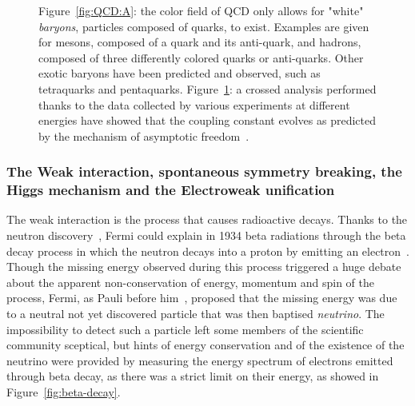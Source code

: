 \begin{figure}[H]
\begin{subfigure}{0.4\linewidth}
			\caption{\label{fig:QCD:B}}
		\end{subfigure}
		\caption{\label{fig:QCD} Figure~\ref{fig:QCD:A}: the color field of QCD only allows for "white" \textit{baryons}, particles composed of quarks, to exist. Examples are given for mesons, composed of a quark and its anti-quark, and hadrons, composed of three differently colored quarks or anti-quarks. Other exotic baryons have been predicted and observed, such as tetraquarks and pentaquarks. Figure~\ref{fig:QCD:B}: a crossed analysis performed thanks to the data collected by various experiments at different energies have showed that the coupling constant evolves as predicted by the mechanism of asymptotic freedom~\cite{BETHKE2003}.}
	\end{figure}
	
	\subsubsection*{The Weak interaction, spontaneous symmetry breaking, the Higgs mechanism and the Electroweak unification}
	\label{chapt2:sssec:HiggsEW}
	
	The weak interaction is the process that causes radioactive decays. Thanks to the neutron discovery~\cite{CHADWICK1932}, Fermi could explain in 1934 beta radiations through the beta decay process in which the neutron decays into a proton by emitting an electron~\cite{FERMI1934}. Though the missing energy observed during this process triggered a huge debate about the apparent non-conservation of energy, momentum and spin of the process, Fermi, as Pauli before him~\cite{PAULI1930}, proposed that the missing energy was due to a neutral not yet discovered particle that was then baptised \textit{neutrino}. The impossibility to detect such a particle left some members of the scientific community sceptical, but hints of energy conservation and of the existence of the neutrino were provided by measuring the energy spectrum of electrons emitted through beta decay, as there was a strict limit on their energy, as showed in Figure~\ref{fig:beta-decay}.
	

